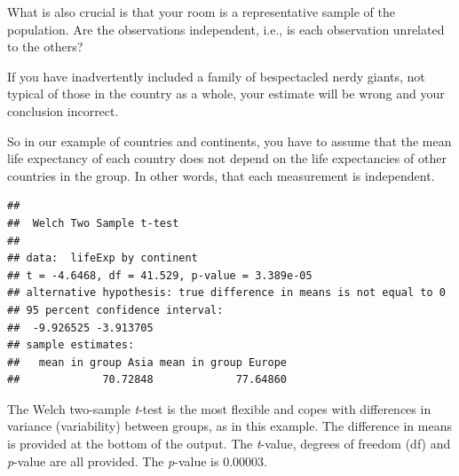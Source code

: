 \documentclass[
  12pt,
  krantz2]{krantz}
\makeatletter
\newenvironment{Shaded}{\begin{snugshade}}{\end{snugshade}}
\newcommand{\CommentTok}[1]{\textcolor[rgb]{0.56,0.35,0.01}{\textit{#1}}}
\newcommand{\DataTypeTok}[1]{\textcolor[rgb]{0.13,0.29,0.53}{#1}}
\newcommand{\DecValTok}[1]{\textcolor[rgb]{0.00,0.00,0.81}{#1}}
\newcommand{\KeywordTok}[1]{\textcolor[rgb]{0.13,0.29,0.53}{\textbf{#1}}}
\newcommand{\NormalTok}[1]{#1}
\newcommand{\OperatorTok}[1]{\textcolor[rgb]{0.81,0.36,0.00}{\textbf{#1}}}
\newcommand{\StringTok}[1]{\textcolor[rgb]{0.31,0.60,0.02}{#1}}
\newenvironment{kframe}{%
\medskip{}
\setlength{\fboxsep}{.8em}
 \def\at@end@of@kframe{}%
 \ifinner\ifhmode%
  \def\at@end@of@kframe{\end{minipage}}%
  \begin{minipage}{\columnwidth}%
 \fi\fi%
 \def\FrameCommand##1{\hskip\@totalleftmargin \hskip-\fboxsep
 \colorbox{shadecolor}{##1}\hskip-\fboxsep
     \hskip-\linewidth \hskip-\@totalleftmargin \hskip\columnwidth}%
 \MakeFramed {\advance\hsize-\width
   \@totalleftmargin\z@ \linewidth\hsize
   \@setminipage}}%
 {\par\unskip\endMakeFramed%
 \at@end@of@kframe}
\renewenvironment{Shaded}{\begin{kframe}}{\end{kframe}}
\makeatother
\begin{document}
What is also crucial is that your room is a representative sample of the population.
Are the observations independent, i.e., is each observation unrelated to the others?

If you have inadvertently included a family of bespectacled nerdy giants, not typical of those in the country as a whole, your estimate will be wrong and your conclusion incorrect.

So in our example of countries and continents, you have to assume that the mean life expectancy of each country does not depend on the life expectancies of other countries in the group. In other words, that each measurement is independent.

\begin{Shaded}
\end{Shaded}

\begin{verbatim}
## 
##  Welch Two Sample t-test
## 
## data:  lifeExp by continent
## t = -4.6468, df = 41.529, p-value = 3.389e-05
## alternative hypothesis: true difference in means is not equal to 0
## 95 percent confidence interval:
##  -9.926525 -3.913705
## sample estimates:
##   mean in group Asia mean in group Europe 
##             70.72848             77.64860
\end{verbatim}


The Welch two-sample \emph{t}-test is the most flexible and copes with differences in variance (variability) between groups, as in this example.
The difference in means is provided at the bottom of the output.
The \emph{t}-value, degrees of freedom (df) and \emph{p}-value are all provided.
The \emph{p}-value is 0.00003.
\end{document}
